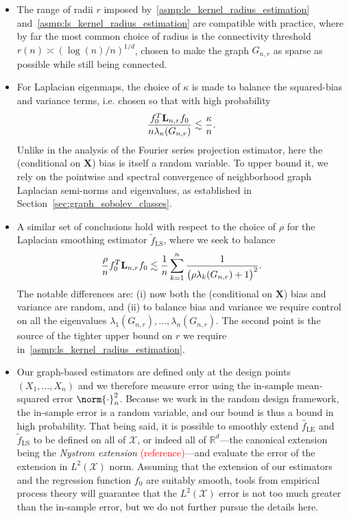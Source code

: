 \documentclass{article}
\newcommand{\Reals}{\mathbb{R}}
\newcommand{\1}{\mathbf{1}}
\newcommand{\Lap}{{\bf L}}
\newcommand{\Xset}{\mathcal{X}}
\newcommand{\Leb}{L}
\newcommand{\wt}[1]{\widetilde{#1}}
\newcommand{\wh}[1]{\widehat{#1}}
\newcommand{\LE}{\mathrm{LE}}
\newcommand{\LS}{\mathrm{LS}}
\theoremstyle{alden}
\theoremstyle{aldenthm}
\theoremstyle{definition}
\theoremstyle{remark}
\begin{document}
\begin{itemize}
	\item The range of radii $r$ imposed by~\ref{asmp:le_kernel_radius_estimation} and~\ref{asmp:ls_kernel_radius_estimation} are compatible with practice, where by far the most common choice of radius is the connectivity threshold $r(n) \asymp (\log(n)/n)^{1/d}$, chosen to make the graph $G_{n,r}$ as sparse as possible while still being connected. 
	\item For Laplacian eigenmaps, the choice of $\kappa$ is made to balance the squared-bias and variance terms, i.e. chosen so that with high probability
	\begin{equation*}
	\frac{f_0^T \Lap_{n,r} f_0}{n \lambda_{\kappa}(G_{n,r})} \lesssim \frac{\kappa}{n}.
	\end{equation*}
	Unlike in the analysis of the Fourier series projection estimator, here the (conditional on $\mathbf{X}$) bias is itself a random variable. To upper bound it, we rely on the pointwise and spectral convergence of neighborhood graph Laplacian semi-norms and eigenvalues, as established in Section~\ref{sec:graph_sobolev_classes}. 
	\item A similar set of conclusions hold with respect to the choice of $\rho$ for the Laplacian smoothing estimator $\wt{f}_{\LS}$, where we seek to balance
	\begin{equation*}
	\frac{\rho}{n} f_0^T \Lap_{{n,r}} f_0 \lesssim \frac{1}{n}\sum_{k = 1}^{n} \frac{1}{\bigl(\rho \lambda_{k}(G_{n,r}) + 1\bigr)^2}.
	\end{equation*}
	The notable differences are: (i) now both the (conditional on $\mathbf{X}$) bias and variance are random, and (ii) to balance bias and variance we require control on all the eigenvalues $\lambda_1(G_{n,r}),\ldots,\lambda_n(G_{n,r})$. The second point is the source of the tighter upper bound on $r$ we require in~\ref{asmp:ls_kernel_radius_estimation}.
	\item Our graph-based estimators are defined only at the design points $(X_1,\ldots,X_n)$ and we therefore measure error using the in-sample mean-squared error $\norm{\cdot}_n^2$. Because we work in the random design framework, the in-sample error is a random variable, and our bound is thus a bound in high probability. That being said, it is possible to smoothly extend $\wh{f}_{\LE}$ and $\wt{f}_{\LS}$ to be defined on all of $\Xset$, or indeed all of $\Reals^d$---the canonical extension being the \emph{Nystrom extension} \textcolor{red}{(reference)}---and evaluate the error of the extension in $\Leb^2(\Xset)$ norm. Assuming that the extension of our estimators and the regression function $f_0$ are suitably smooth, tools from empirical process theory will guarantee that the $\Leb^2(\Xset)$ error is not too much greater than the in-sample error, but we do not further pursue the details here.

\end{itemize}
\end{document}
